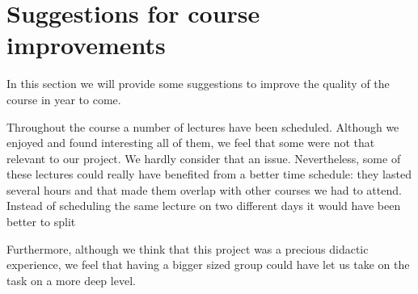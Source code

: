 \section{Suggestions for course improvements}

In this section we will provide some suggestions to improve the quality of the course in year to come.

Throughout the course a number of lectures have been scheduled. Although we enjoyed and found interesting
all of them, we feel that some were not that relevant to our project. We hardly consider that an issue.
Nevertheless, some of these lectures could really have benefited from a better time schedule:
they lasted several hours and that made them overlap with other courses we had to attend.
Instead of scheduling the same lecture on two different days it would have been better
to split

Furthermore, although we think that this project was a precious didactic experience, we feel
that having a bigger sized group could have let us take on the task on a more deep level.




